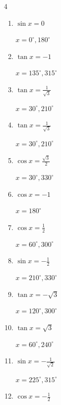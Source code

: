 \begin{multicols}{4}
\begin{enumerate}
  \item $\displaystyle \sin{x}  = 0$

        $\displaystyle x = 0^{\circ} , 180^{\circ}$

  \item $\displaystyle \tan{x}  = -1$

        $\displaystyle x = 135^{\circ} , 315^{\circ}$

  \item $\displaystyle \tan{x}  = \frac{1}{\sqrt{3}}$

        $\displaystyle x = 30^{\circ} , 210^{\circ}$

  \item $\displaystyle \tan{x}  = \frac{1}{\sqrt{3}}$

        $\displaystyle x = 30^{\circ} , 210^{\circ}$

  \item $\displaystyle \cos{x}  = \frac{\sqrt{3}}{2}$

        $\displaystyle x = 30^{\circ} , 330^{\circ}$

  \item $\displaystyle \cos{x}  = -1$

        $\displaystyle x = 180^{\circ}$

  \item $\displaystyle \cos{x}  = \frac{1}{2}$

        $\displaystyle x = 60^{\circ} , 300^{\circ}$

\columnbreak %

\resetques

  \item $\displaystyle \sin{x}  = -\frac{1}{2}$

        $\displaystyle x = 210^{\circ} , 330^{\circ}$

  \item $\displaystyle \tan{x}  = -\sqrt{3}$

        $\displaystyle x = 120^{\circ} , 300^{\circ}$

  \item $\displaystyle \tan{x}  = \sqrt{3}$

        $\displaystyle x = 60^{\circ} , 240^{\circ}$

  \item $\displaystyle \sin{x}  = -\frac{1}{\sqrt{2}}$

        $\displaystyle x = 225^{\circ} , 315^{\circ}$

  \item $\displaystyle \cos{x}  = -\frac{1}{2}$


\end{enumerate}
\end{multicols}
